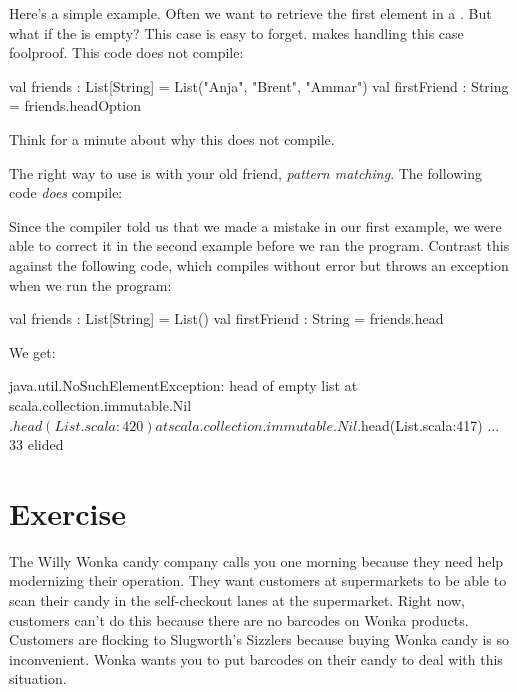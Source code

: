 \documentclass{book}
\begin{document}
Here's a simple example.  Often we want to retrieve the first element in a .  But what if the  is empty?  This case is easy to forget.   makes handling this case foolproof.  This code does not compile:

\begin{scalacode}
val friends : List[String] = List("Anja", "Brent", "Ammar")
val firstFriend : String = friends.headOption
\end{scalacode}

Think for a minute about why this does not compile.

The right way to use  is with your old friend, \emph{pattern matching}.  The following code \emph{does} compile:


Since the compiler told us that we made a mistake in our first example, we were able to correct it in the second example before we ran the program.  Contrast this against the following code, which compiles without error but throws an exception when we run the program:

\begin{scalacode}
val friends : List[String] = List()
val firstFriend : String = friends.head
\end{scalacode}

We get:

\begin{scalacode}
java.util.NoSuchElementException: head of empty list
  at scala.collection.immutable.Nil$.head(List.scala:420)
  at scala.collection.immutable.Nil$.head(List.scala:417)
  ... 33 elided
\end{scalacode}

\section{Exercise}

The Willy Wonka candy company calls you one morning because they need help modernizing their operation.  They want customers at supermarkets to be able to scan their candy in the self-checkout lanes at the supermarket.  Right now, customers can't do this because there are no barcodes on Wonka products.  Customers are flocking to Slugworth's Sizzlers because buying Wonka candy is so inconvenient.  Wonka wants you to put barcodes on their candy to deal with this situation.
\end{document}
